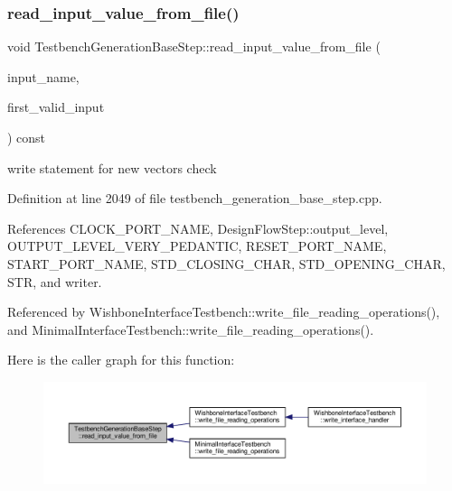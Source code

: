 \subsubsection{\texorpdfstring{read\+\_\+input\+\_\+value\+\_\+from\+\_\+file()}{read\_input\_value\_from\_file()}}
{\footnotesize\ttfamily void Testbench\+Generation\+Base\+Step\+::read\+\_\+input\+\_\+value\+\_\+from\+\_\+file (\begin{DoxyParamCaption}\item[{const std\+::string \&}]{input\+\_\+name,  }\item[{bool \&}]{first\+\_\+valid\+\_\+input }\end{DoxyParamCaption}) const\hspace{0.3cm}{\ttfamily [protected]}}

write statement for new vectors\textquotesingle{} check 

Definition at line 2049 of file testbench\+\_\+generation\+\_\+base\+\_\+step.\+cpp.



References C\+L\+O\+C\+K\+\_\+\+P\+O\+R\+T\+\_\+\+N\+A\+ME, Design\+Flow\+Step\+::output\+\_\+level, O\+U\+T\+P\+U\+T\+\_\+\+L\+E\+V\+E\+L\+\_\+\+V\+E\+R\+Y\+\_\+\+P\+E\+D\+A\+N\+T\+IC, R\+E\+S\+E\+T\+\_\+\+P\+O\+R\+T\+\_\+\+N\+A\+ME, S\+T\+A\+R\+T\+\_\+\+P\+O\+R\+T\+\_\+\+N\+A\+ME, S\+T\+D\+\_\+\+C\+L\+O\+S\+I\+N\+G\+\_\+\+C\+H\+AR, S\+T\+D\+\_\+\+O\+P\+E\+N\+I\+N\+G\+\_\+\+C\+H\+AR, S\+TR, and writer.



Referenced by Wishbone\+Interface\+Testbench\+::write\+\_\+file\+\_\+reading\+\_\+operations(), and Minimal\+Interface\+Testbench\+::write\+\_\+file\+\_\+reading\+\_\+operations().

Here is the caller graph for this function\+:
\nopagebreak
\begin{figure}[H]
\begin{center}
\leavevmode
\includegraphics[width=350pt]{dc/d02/classTestbenchGenerationBaseStep_a5ce35855c2c92e267d07b648b69dbbe3_icgraph}
\end{center}
\end{figure}
\mbox{\label{classTestbenchGenerationBaseStep_a91b50173691b97e21e807b6b65aed466}} 
